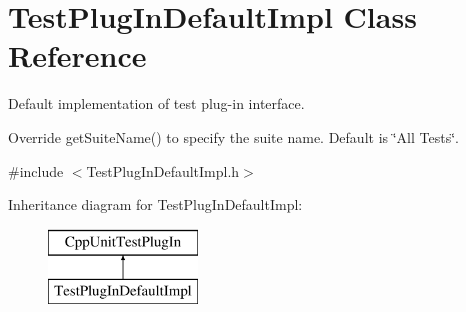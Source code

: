\hypertarget{class_test_plug_in_default_impl}{}\section{Test\+Plug\+In\+Default\+Impl Class Reference}
\label{class_test_plug_in_default_impl}


Default implementation of test plug-\/in interface.

Override get\+Suite\+Name() to specify the suite name. Default is \char`\"{}\+All Tests\char`\"{}.  




{\ttfamily \#include $<$Test\+Plug\+In\+Default\+Impl.\+h$>$}

Inheritance diagram for Test\+Plug\+In\+Default\+Impl\+:\begin{figure}[H]
\begin{center}
\leavevmode
\includegraphics[height=2.000000cm]{class_test_plug_in_default_impl}
\end{center}
\end{figure}
